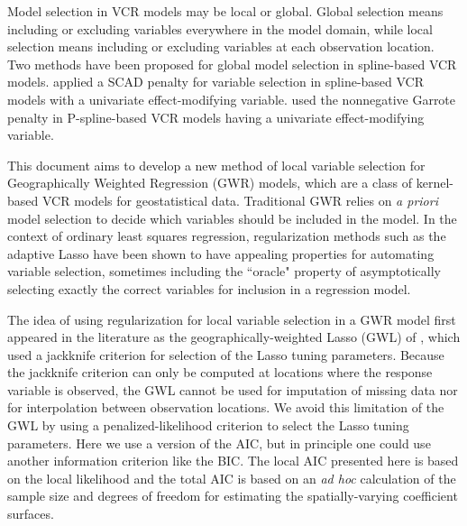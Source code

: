 \documentclass[authoryear, review, 11pt]{elsarticle}
\begin{document}
	Model selection in VCR models may be local or global. Global selection means including or excluding variables everywhere in the model domain, while local selection means including or excluding variables at each observation location. Two methods have been proposed for global model selection in spline-based VCR models. \cite{Wang:2008a} applied a SCAD penalty \citep{Fan:2001} for variable selection in spline-based VCR models with a univariate effect-modifying variable. \cite{Antoniadis:2012a} used the nonnegative Garrote penalty \citep{Breiman:1995} in P-spline-based VCR models having a univariate effect-modifying variable.

	This document aims to develop a new method of local variable selection for Geographically Weighted Regression (GWR) models, which are a class of kernel-based VCR models for geostatistical data. Traditional GWR relies on \emph{a priori} model selection to decide which variables should be included in the model. In the context of ordinary least squares regression, regularization methods such as the adaptive Lasso \citep{Zou:2006} have been shown to have appealing properties for automating variable selection, sometimes including the ``oracle" property of asymptotically selecting exactly the correct variables for inclusion in a regression model.
	
	The idea of using regularization for local variable selection in a GWR model first appeared in the literature as the geographically-weighted Lasso (GWL) of \cite{Wheeler:2009}, which used a jackknife criterion for selection of the Lasso tuning parameters. Because the jackknife criterion can only be computed at locations where the response variable is observed, the GWL cannot be used for imputation of missing data nor for interpolation between observation locations. We avoid this limitation of the GWL by using a penalized-likelihood criterion to select the Lasso tuning parameters. Here we use a version of the AIC, but in principle one could use another information criterion like the BIC. The local AIC presented here is based on the local likelihood \citep{Loader:1999} and the total AIC is based on an \emph{ad hoc} calculation of the sample size and degrees of freedom for estimating the spatially-varying coefficient surfaces.
\end{document}
